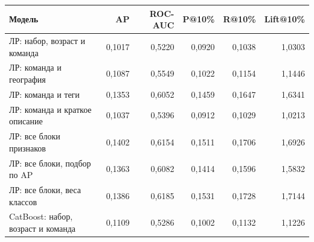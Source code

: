 \begin{tabular}{@{}>{\raggedright\arraybackslash}p{6.4cm}rrrrr@{}}
\toprule
Модель & AP & ROC-AUC & P@10\% & R@10\% & Lift@10\% \\
\midrule
ЛР: набор, возраст и команда & 0,1017 & 0,5220 & 0,0920 & 0,1038 & 1,0303 \\
ЛР: команда и география & 0,1087 & 0,5549 & 0,1022 & 0,1154 & 1,1446 \\
ЛР: команда и теги & 0,1353 & 0,6052 & 0,1459 & 0,1647 & 1,6341 \\
ЛР: команда и краткое описание & 0,1037 & 0,5396 & 0,0912 & 0,1029 & 1,0213 \\
ЛР: все блоки признаков & 0,1402 & 0,6154 & 0,1511 & 0,1706 & 1,6926 \\
ЛР: все блоки, подбор по AP & 0,1363 & 0,6082 & 0,1414 & 0,1596 & 1,5832 \\
ЛР: все блоки, веса классов & 0,1386 & 0,6185 & 0,1531 & 0,1728 & 1,7144 \\
CatBoost: набор, возраст и команда & 0,1109 & 0,5286 & 0,1002 & 0,1132 & 1,1226 \\
\bottomrule
\end{tabular}
